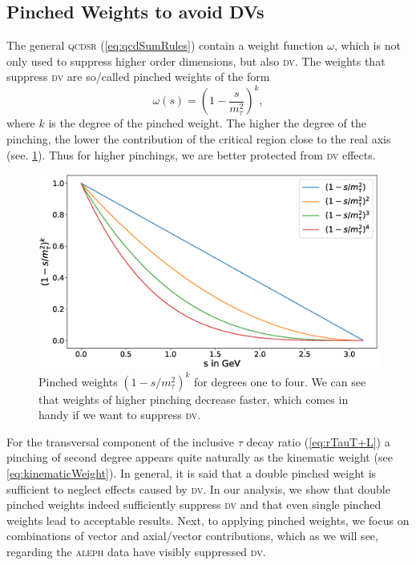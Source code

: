\documentclass[../../index.tex]{subfiles}
\begin{document}
\subsection{Pinched Weights to avoid DVs}
\label{sec:pinchedWeights}
The general \textsc{qcdsr} (\cref{eq:qcdSumRules}) contain a weight function
\(\omega\), which is not only used to suppress higher order dimensions, but also
\textsc{dv}. The weights that suppress \textsc{dv} are so\-/called pinched
weights of the form
\begin{equation}
  \omega(s) = \left(1-\frac{s}{m_\tau^2}\right)^k,
\end{equation}
where \(k\) is the degree of the pinched weight. The higher the degree of the
pinching, the lower the contribution of the critical region close to the real
axis (see. \cref{fig:monomialWeightGraphs}). Thus for higher pinchings, we are
better protected from \textsc{dv} effects.
\begin{figure}
  \centering
  \includegraphics[width=\textwidth]{./images/monomialWeightGraphs.eps}
  \caption{Pinched weights \((1-s/m_\tau^2)^k\) for degrees one to four. We
    can see that weights of higher pinching decrease faster, which comes in
    handy if we want to suppress \textsc{dv}.}
  \label{fig:monomialWeightGraphs}
\end{figure}
For the transversal component of the inclusive \(\tau\) decay ratio
(\cref{eq:rTauT+L}) a pinching of second degree appears quite naturally as the
kinematic weight (see \cref{eq:kinematicWeight}). In general, it is said that a
double pinched weight is sufficient to neglect effects caused by \textsc{dv}. In
our analysis, we show that double pinched weights indeed sufficiently suppress
\textsc{dv} and that even single pinched weights lead to acceptable results.
Next, to applying pinched weights, we focus on combinations of vector
and axial\-/vector contributions, which as we will see, regarding the
\textsc{aleph} data have visibly suppressed \textsc{dv}.
\end{document}
